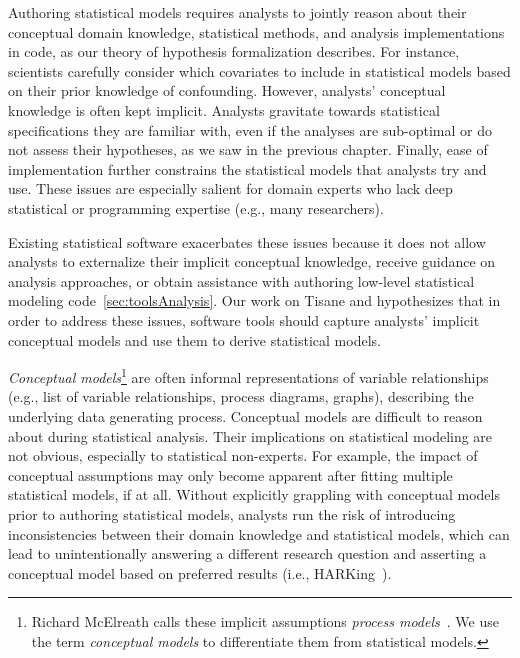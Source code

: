 \def\adult{\texttt{adult}\xspace}
\def\poundslost{\texttt{pounds\_lost}\xspace}
\def\motivation{\texttt{motivation}\xspace}
\def\regimen{\texttt{regimen\_condition}\xspace}
\def\regimencondition{\texttt{regimen\_condition}\xspace}
\def\group{\texttt{group}\xspace}
\def\age{\texttt{age}\xspace}


Authoring statistical models requires analysts to jointly reason about their
conceptual domain knowledge, statistical methods, and analysis implementations
in code, as our theory of hypothesis formalization describes. For instance,
scientists carefully consider which covariates to include in statistical models
based on their prior knowledge of confounding. However, analysts' conceptual
knowledge is often kept implicit. Analysts gravitate towards statistical
specifications they are familiar with, even if the analyses are sub-optimal or
do not assess their hypotheses, as we saw in the previous chapter. Finally, ease
of implementation further constrains the statistical models that analysts try
and use. These issues are especially salient for domain experts who lack deep
statistical or programming expertise (e.g., many researchers).

Existing statistical software exacerbates these issues because it does not allow
analysts to externalize their implicit conceptual knowledge, receive guidance on
analysis approaches, or obtain assistance with authoring low-level statistical modeling
code~\autoref{sec:toolsAnalysis}. Our work on Tisane and \rTisane hypothesizes that in order
to address these issues, software tools should capture analysts' implicit
conceptual models and use them to derive statistical models. 

\textit{Conceptual models}\footnote{Richard McElreath calls these implicit
assumptions \textit{process models}~\cite{mcelreath2020statistical}. We use the
term \textit{conceptual models} to differentiate them from statistical models.}
are often informal representations of variable relationships (e.g., list of
variable relationships, process diagrams, graphs), describing the underlying
data generating process. Conceptual models are difficult to reason about during
statistical analysis. Their implications on statistical modeling are not
obvious, especially to statistical non-experts. For example, the impact of
conceptual assumptions may only become apparent after fitting multiple
statistical models, if at all. Without explicitly grappling with conceptual
models prior to authoring statistical models, analysts run the risk of
introducing inconsistencies between their domain knowledge and statistical
models, which can lead to unintentionally answering a different research
question and asserting a conceptual model based on preferred results (i.e.,
HARKing~\cite{kerr1998harking}). 

